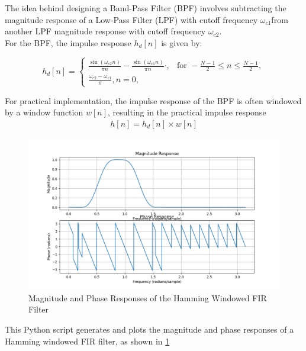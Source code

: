 \documentclass{article}
\begin{document}
The idea behind designing a Band-Pass Filter (BPF) involves subtracting the magnitude response of a Low-Pass Filter (LPF) with cutoff frequency $\omega_{c1}$from another LPF magnitude response with cutoff frequency \(\omega_{c2}\).\\

For the BPF, the impulse response \(h_d[n]\) is given by:

\begin{equation}
h_d[n] = \begin{cases}
    \frac{{\sin(\omega_{c2} n)}}{\pi n} - \frac{{\sin(\omega_{c1} n)}}{\pi n} \cdot , & \text{for } -\frac{N - 1}{2} \leq n \leq \frac{N - 1}{2}, \\
  \frac{{\omega_{c2} - \omega_{c1}}}{{\pi}},n=  0,
\end{cases}
\end{equation}

For practical implementation, the impulse response of the BPF is often windowed by a window function \( w[n] \), resulting in the practical impulse response 
\begin{align}
 h[n] = h_d[n] \times w[n] 
\end{align}
\begin{figure}[ht]
  \centering
  \includegraphics[scale=0.7]{./dsp/figs/bphase_response.png}
  \caption{Magnitude and Phase Responses of the Hamming Windowed FIR Filter}
  \label{fig:bpf}
\end{figure}
\begin{center}
\end{center}

This Python script generates and plots the magnitude and phase responses of a Hamming windowed FIR filter, as shown in \ref{fig:bpf}
\end{document}
